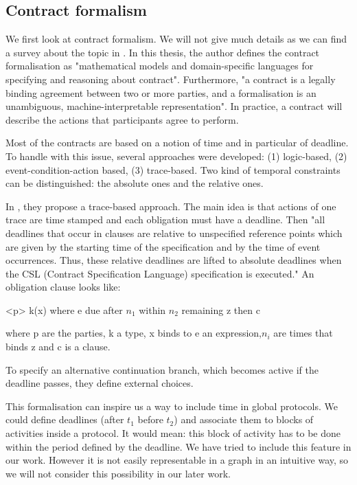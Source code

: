 \documentclass[a4paper,11pt,twoside]{report}
\begin{document}
\subsection{Contract formalism}
We first look at contract formalism. We will not give much details as we can find a survey about the topic in \cite{hvitved12phd}. In this thesis, the author defines the contract formalisation as "mathematical models and domain-specific languages for specifying and reasoning about contract". Furthermore, "a contract is a legally binding agreement between two or more parties, and a formalisation is an unambiguous, machine-interpretable representation". In practice, a contract will describe the actions that participants agree to perform.

Most of the contracts are based on a notion of time and in particular of deadline. To handle with this issue, several approaches were developed: (1) logic-based, (2) event-condition-action based, (3) trace-based. Two kind of temporal constraints can be distinguished: the absolute ones and the relative ones.

In \cite{hvitved12jlap}, they propose a trace-based approach. The main idea is that actions of one trace are time stamped and each obligation must have a deadline. Then "all deadlines that occur in clauses are relative to unspecified reference points which are given by the starting time of the specification and by the time of event occurrences. Thus, these relative deadlines are lifted to absolute deadlines when the CSL (Contract Specification Language) specification is executed." An obligation clause looks like:
\begin{center}
<p> k(x) where e due after $n_{1}$ within $n_{2}$ remaining z then c
\end{center}
where p are the parties, k a type, x binds to e an expression,$ n_{i}$ are times that binds z and c is a clause.

To specify an alternative continuation branch, which becomes active if the deadline passes, they define external choices.

This formalisation can inspire us a way to include time in global protocols. We could define deadlines (after $t_{1}$ before $t_{2}$) and associate them to blocks of activities inside a protocol. It would mean: this block of activity has to be done within the period defined by the deadline. We have tried to include this feature in our work. However it is not easily representable in a graph in an intuitive way, so we will not consider this possibility in our later work.
\end{document}
